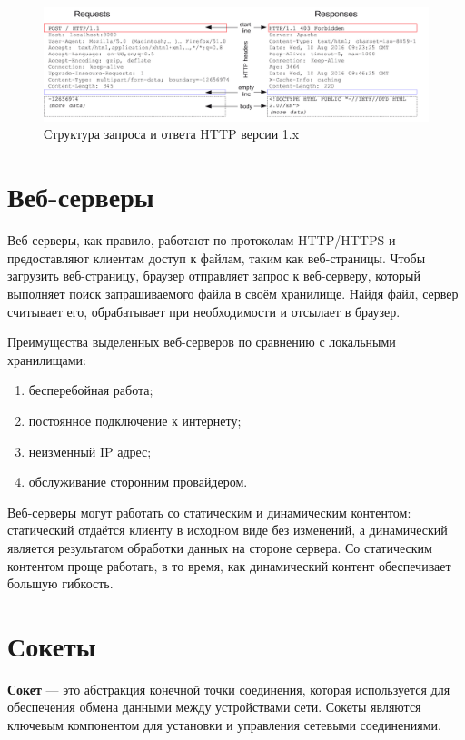 \begin{figure}[H]
	\centering
	\includegraphics[width=\textwidth]{assets/http.png}
	\caption{Структура запроса и ответа HTTP версии 1.x}
	\label{fig:http}
\end{figure}



\section{Веб-серверы}

Веб-серверы, как правило, работают по протоколам HTTP/HTTPS и предоставляют клиентам доступ к файлам, таким как веб-страницы. Чтобы загрузить веб-страницу, браузер отправляет запрос к веб-серверу, который выполняет поиск запрашиваемого файла в своём хранилище. Найдя файл, сервер считывает его, обрабатывает при необходимости и отсылает в браузер. \cite{web_server}

Преимущества выделенных веб-серверов по сравнению с локальными хранилищами: \cite{web_server}

\begin{enumerate}[label*=\arabic*)]
	\item бесперебойная работа;
	\item постоянное подключение к интернету;
	\item неизменный IP адрес;
	\item обслуживание сторонним провайдером.
\end{enumerate}

Веб-серверы могут работать со статическим и динамическим контентом: статический отдаётся клиенту в исходном виде без изменений, а динамический является результатом обработки данных на стороне сервера. Со статическим контентом проще работать, в то время, как динамический контент обеспечивает большую гибкость. \cite{web_server}

\section{Сокеты}

\textbf{Сокет} --- это абстракция конечной точки соединения, которая используется для обеспечения обмена данными между устройствами сети. Сокеты являются ключевым компонентом для установки и управления сетевыми соединениями.

